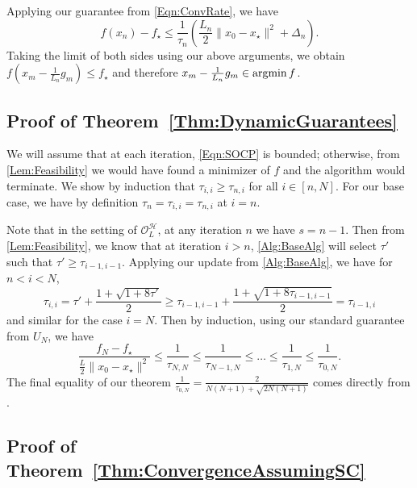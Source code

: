 \documentclass[11pt]{article}
\numberwithin{equation}{section}
\newcommand{\argmin}{\operatornamewithlimits{argmin}}
\newcommand{\idxArgmin}{m}
\newcommand{\idxLastSuccess}{s}
\theoremstyle{definition}
\theoremstyle{plain}
\theoremstyle{definition}
\begin{document}
Applying our guarantee from \eqref{Eqn:ConvRate}, we have
\begin{equation*}
    f(x_n) - f_\star \leq \frac{1}{\tau_n}\left( \frac{L_n}{2}\|x_0 - x_\star\|^2 + \Delta_n \right) .
\end{equation*}
Taking the limit of both sides using our above arguments, we obtain $f(x_\idxArgmin - \frac{1}{L_n} g_\idxArgmin) \leq f_\star$ and therefore  $x_\idxArgmin - \frac{1}{L_n} g_\idxArgmin \in \argmin f$.



\subsection{Proof of Theorem~\ref{Thm:DynamicGuarantees}} \label{SubSec:DynamicProof}

We will assume that at each iteration, \eqref{Eqn:SOCP} is bounded; otherwise, from \cref{Lem:Feasibility} we would have found a minimizer of $f$ and the algorithm would terminate. We show by induction that $\tau_{i,i} \geq \tau_{n,i}$ for all $i \in [n,N]$. For our base case, we have by definition $\tau_n = \tau_{i,i} = \tau_{n,i}$ at $i = n$.

Note that in the setting of $\mathcal{O}^\mathcal{H}_L$, at any iteration $n$ we have $\idxLastSuccess = n-1$.
Then from \cref{Lem:Feasibility}, we know that at iteration $i > n$, \cref{Alg:BaseAlg} will select $\tau'$ such that $\tau' \geq \tau_{i-1,i-1}$. Applying our update from \cref{Alg:BaseAlg}, we have
for $n < i < N$,
\begin{equation*}
    \tau_{i,i} =\tau' + \frac{1 + \sqrt{1+8\tau'}}{2}  \geq \tau_{i-1,i-1} + \frac{1 + \sqrt{1+8\tau_{i-1,i-1}}}{2} 
     = \tau_{i-1,i}
\end{equation*}
and similar for the case $i=N$.
Then by induction, using our standard guarantee from $U_N$, we have
\begin{equation*}
    \frac{f_N - f_\star}{\frac{L}{2}\|x_0-x_\star\|^2} \leq \frac{1}{\tau_{N,N}} \leq \frac{1}{\tau_{N-1,N}} \leq \dots \leq \frac{1}{\tau_{1,N}} \leq \frac{1}{\tau_{0,N}}.
\end{equation*}
The final equality of our theorem $\frac{1}{\tau_{0,N}} = \frac{2}{N(N+1)+\sqrt{2N(N+1)}}$ comes directly from \cite[Theorem 4]{OBL}.

\subsection{Proof of Theorem~\ref{Thm:ConvergenceAssumingSC}} \label{SubSec:ConvAssumingSCProof}
\end{document}
